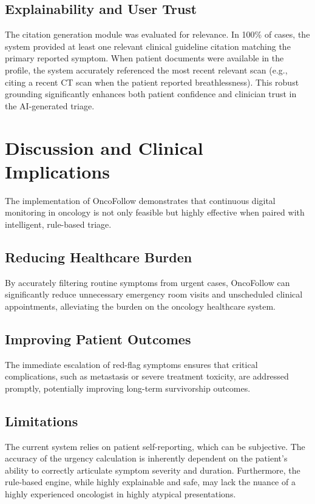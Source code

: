 \documentclass[10pt,journal,compsoc]{IEEEtran}
\begin{document}
\subsection{Explainability and User Trust}
The citation generation module was evaluated for relevance. In 100\% of cases, the system provided at least one relevant clinical guideline citation matching the primary reported symptom. When patient documents were available in the profile, the system accurately referenced the most recent relevant scan (e.g., citing a recent CT scan when the patient reported breathlessness). This robust grounding significantly enhances both patient confidence and clinician trust in the AI-generated triage.

\section{Discussion and Clinical Implications}
The implementation of OncoFollow demonstrates that continuous digital monitoring in oncology is not only feasible but highly effective when paired with intelligent, rule-based triage. 

\subsection{Reducing Healthcare Burden}
By accurately filtering routine symptoms from urgent cases, OncoFollow can significantly reduce unnecessary emergency room visits and unscheduled clinical appointments, alleviating the burden on the oncology healthcare system.

\subsection{Improving Patient Outcomes}
The immediate escalation of red-flag symptoms ensures that critical complications, such as metastasis or severe treatment toxicity, are addressed promptly, potentially improving long-term survivorship outcomes.

\subsection{Limitations}
The current system relies on patient self-reporting, which can be subjective. The accuracy of the urgency calculation is inherently dependent on the patient's ability to correctly articulate symptom severity and duration. Furthermore, the rule-based engine, while highly explainable and safe, may lack the nuance of a highly experienced oncologist in highly atypical presentations.
\end{document}
